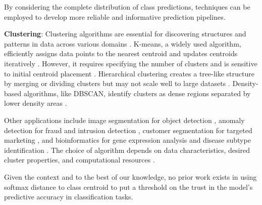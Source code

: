 By considering the complete distribution of class predictions, techniques can be employed to develop more reliable and informative prediction pipelines. 


\textbf{Clustering}: Clustering algorithms are essential for discovering structures and patterns in data across various domains \cite{jain2010data, xu2015comprehensive}. K-means, a widely used algorithm, efficiently assigns data points to the nearest centroid and updates centroids iteratively \cite{lloyd1982least}. However, it requires specifying the number of clusters and is sensitive to initial centroid placement \cite{arthur2007k}. Hierarchical clustering creates a tree-like structure by merging or dividing clusters \cite{johnson1967hierarchical} but may not scale well to large datasets \cite{mullner2011modern}. Density-based algorithms, like DBSCAN, identify clusters as dense regions separated by lower density areas \cite{ester1996density, schubert2017dbscan}.

Other applications include image segmentation for object detection \cite{shi2000normalized}, anomaly detection for fraud and intrusion detection \cite{chandola2009anomaly}, customer segmentation for targeted marketing \cite{ngai2009application}, and bioinformatics for gene expression analysis and disease subtype identification \cite{eisen1998cluster, jiang2004cluster}. The choice of algorithm depends on data characteristics, desired cluster properties, and computational resources \cite{rodriguez2019clustering}.

Given the context and to the best of our knowledge, no prior work exists in using softmax distance to class centroid to put a threshold on the trust in the model's predictive accuracy in classification tasks.


